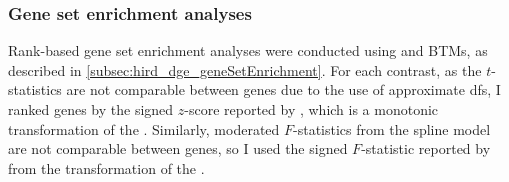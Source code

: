 

\subsubsection{Gene set enrichment analyses}

Rank-based gene set enrichment analyses were conducted using  \autocite{weiner3rd2016TmodPackageGeneral} and \glspl{BTM}, as described in \cref{subsec:hird_dge_geneSetEnrichment}.
%
For each contrast, 
as the $t$-statistics are not comparable between genes due to the use of approximate \glspl{df},
I ranked genes by the signed $z$-score reported by , which is a monotonic transformation of the \pvalue{}.
Similarly, moderated $F$-statistics from the spline model are not comparable between genes, so I used the signed $F$-statistic reported by  from the transformation of the \pvalue{}.

